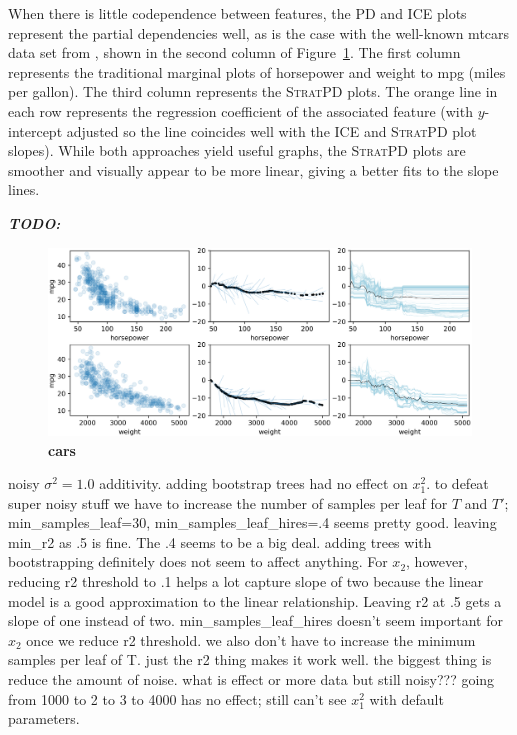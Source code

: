 \documentclass[12pt]{article}
\newcommand{\figref}[1]{Figure~\ref{#1}}
\newcommand{\todo}[1]{{\bf\em TODO:} {{\color{red}{#1}}}}
\newcommand{\spd}{\fontfamily{cmr}\textsc{\small StratPD}}
\begin{document}
When there is little codependence between features, the PD and ICE plots represent the partial dependencies well, as is the case with the well-known mtcars data set from \cite{mtcars}, shown in the second column of \figref{fig:cars}.  The first column represents the traditional marginal plots of horsepower and weight to mpg (miles per gallon). The third column represents the \spd{} plots. The orange line in each row represents the regression coefficient of the associated feature (with $y$-intercept adjusted so the line coincides well with the ICE and \spd{} plot slopes).  While both approaches yield useful graphs, the \spd{} plots are smoother and visually appear to be more linear, giving a better fits to the slope lines.

\todo{CARS: edges/outliers of weight and hp not valid as nonsensical values; smoother. clearly nonlinear physics.}

\begin{figure}[htbp]
\begin{center}
\includegraphics[scale=0.7]{images/cars.png}
\caption{{\bf  cars}}
\label{fig:cars}
\end{center}
\end{figure}

noisy $\sigma^2 = 1.0$ additivity. adding bootstrap trees had no effect on $x_1^2$.  to defeat super noisy stuff we have to increase the number of samples per leaf for $T$ and $T'$; min\_samples\_leaf=30, min\_samples\_leaf\_hires=.4 seems pretty good.  leaving min\_r2 as .5 is fine.  The .4 seems to be a big deal.   adding trees with bootstrapping definitely does not seem to affect anything.  For $x_2$, however, reducing r2 threshold to .1 helps a lot capture slope of two because the linear model is a good approximation to the linear relationship. Leaving r2 at .5 gets a slope of one instead of two. min\_samples\_leaf\_hires doesn't seem important for $x_2$ once we reduce r2 threshold. we also don't have to increase the minimum samples per leaf of T. just the r2 thing makes it work well. the biggest thing is reduce the amount of noise. what is effect or more data but still noisy??? going from 1000 to 2 to 3 to 4000 has no effect; still can't see $x_1^2$ with  default parameters.
\end{document}
